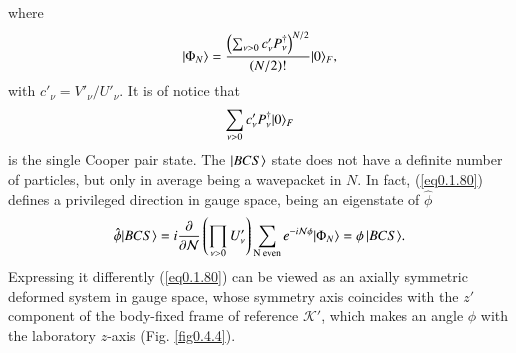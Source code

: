 where
\begin{align}\label{eq0.1.81}
|{\Phi_{N}} \rangle=\frac{\left(\sum_{\nu>0}c'_\nu P^\dagger_\nu\right)^{N/2}}{\left(N/2\right)!}|{0} \rangle_F,
\end{align}
with $c'_\nu=V'_\nu/U'_\nu$. It is of notice that
\begin{align}\label{eq0.1.82}
\sum_{\nu>0}c'_\nu P^\dagger_\nu|{0} \rangle_F
\end{align}
is the single Cooper pair state.  The  $|{BCS} \rangle$ state does not have a definite number of particles, but only in average being a wavepacket in $N$. 
In fact, (\ref{eq0.1.80}) defines a privileged direction in gauge space, being an eigenstate of $\hat\phi$ 
\begin{align}\label{eq0.1.83}
\hat\phi|{BCS} \rangle=i\frac{\partial}{\partial \mathcal N}\left(\prod_{\nu>0}U'_\nu\right)\sum_{\text{N even}}e^{-i\mathcal N\phi}|{\Phi_{N}} \rangle=\phi\,|{BCS} \rangle.
\end{align}
Expressing it differently (\ref{eq0.1.80}) can be viewed as an axially symmetric deformed system in gauge space, whose symmetry axis coincides with the $z'$ component of the body-fixed frame of reference $\mathcal K'$, which makes an angle $\phi$ with the laboratory $z$-axis (Fig. \ref{fig0.4.4}). 

